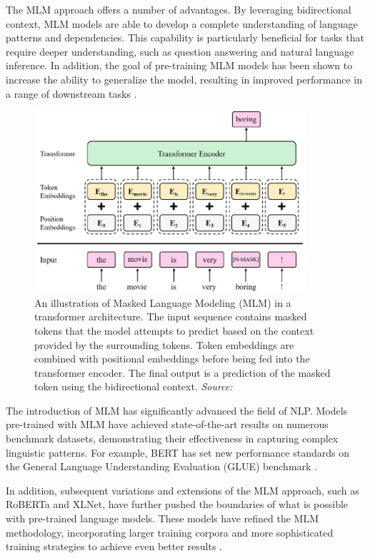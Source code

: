 The MLM approach offers a number of advantages. By leveraging bidirectional context, MLM models are able to develop a complete understanding of language patterns and dependencies. This capability is particularly beneficial for tasks that require deeper understanding, such as question answering and natural language inference. In addition, the goal of pre-training MLM models has been shown to increase the ability to generalize the model, resulting in improved performance in a range of downstream tasks \cite{yang2019xlnet}.

\begin{figure}[h]
    \centering
    \includegraphics[width=0.9\textwidth]{images/llms/Model-structure-of-the-label-masked-language-model-N-MASK-is-a-mask-token-containing.png}
    \caption{An illustration of Masked Language Modeling (MLM) in a transformer architecture. The input sequence contains masked tokens that the model attempts to predict based on the context provided by the surrounding tokens. Token embeddings are combined with positional embeddings before being fed into the transformer encoder. The final output is a prediction of the masked token using the bidirectional context. \textit{Source:} \cite{park2019}}
    \label{fig:mlm_architecture}
\end{figure}

The introduction of MLM has significantly advanced the field of NLP. Models pre-trained with MLM have achieved state-of-the-art results on numerous benchmark datasets, demonstrating their effectiveness in capturing complex linguistic patterns. For example, BERT has set new performance standards on the General Language Understanding Evaluation (GLUE) benchmark \cite{wang2018glue}.

In addition, subsequent variations and extensions of the MLM approach, such as RoBERTa and XLNet, have further pushed the boundaries of what is possible with pre-trained language models. These models have refined the MLM methodology, incorporating larger training corpora and more sophisticated training strategies to achieve even better results \cite{liu2019roberta, yang2019xlnet}.

